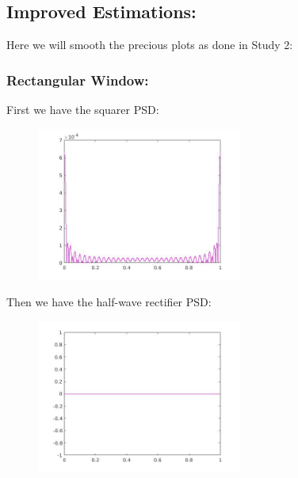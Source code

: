 \documentclass[a4paper,11pt]{article}
\begin{document}
\newpage

\subsection{Improved Estimations:}

Here we will smooth the precious plots as done in Study 2:

\subsubsection{Rectangular Window:}

First we have the squarer PSD:
\begin{figure}[!hp]
    \begin{center}
    \includegraphics[width=0.6\textwidth]{images/lab3_22.jpg}
    \end{center}
\end{figure}

Then we have the half-wave rectifier PSD:

\begin{figure}[!hp]
    \begin{center}
    \includegraphics[width=0.6\textwidth]{images/lab3_32.jpg}
    \end{center}
\end{figure}
\end{document}
